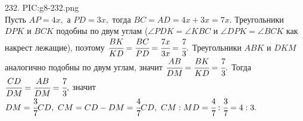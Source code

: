 232. {{PIC:g8-232.png}}\\
Пусть $AP=4x,$ а $PD=3x,$ тогда $BC=AD=4x+3x=7x.$ Треугольники $DPK$ и $BCK$ подобны по двум углам ($\angle PDK=\angle KBC$ и $\angle DPK=\angle BCK$ как накрест лежащие), поэтому $\cfrac{BK}{KD}=\cfrac{BC}{PD}=\cfrac{7x}{3x}=\cfrac{7}{3}.$ Треугольники $ABK$ и $DKM$ аналогично подобны по двум углам, значит $\cfrac{AB}{DM}=\cfrac{BK}{KD}=\cfrac{7}{3}.$ Тогда $\cfrac{CD}{DM}=\cfrac{AB}{DM}=\cfrac{7}{3},$ значит $DM=\cfrac{3}{7}CD,\ CM=CD-DM=\cfrac{4}{7}CD,\ CM:MD=\cfrac{4}{7}:\cfrac{3}{7}=4:3.$\\
